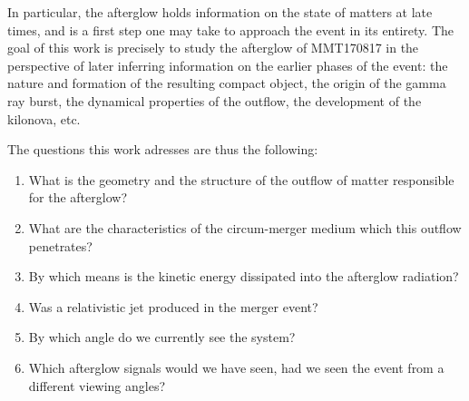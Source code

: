 In particular, the afterglow holds information on the state of matters at late times, and is a first step one may take to approach the event in its entirety. The goal of this work is precisely to study the afterglow of MMT170817 in the perspective of later inferring information on the earlier phases of the event: the nature and formation of the resulting compact object, the origin of the gamma ray burst, the dynamical properties of the outflow, the development of the kilonova, etc.

The questions this work adresses are thus the following:

\begin{enumerate}
	\item What is the geometry and the structure of the outflow of matter responsible for the afterglow?
	\item What are the characteristics of the circum-merger medium which this outflow penetrates?
	\item By which means is the kinetic energy dissipated into the afterglow radiation?
	\item Was a relativistic jet produced in the merger event?
	\item By which angle do we currently see the system?
	\item Which afterglow signals would we have seen, had we seen the event from a different viewing angles?
\end{enumerate}

